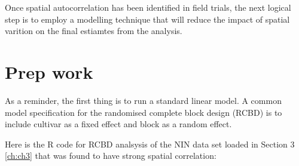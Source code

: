 \documentclass[]{book}
\newenvironment{Shaded}{\begin{snugshade}}{\end{snugshade}}
\newcommand{\DataTypeTok}[1]{\textcolor[rgb]{0.13,0.29,0.53}{#1}}
\newcommand{\ErrorTok}[1]{\textcolor[rgb]{0.64,0.00,0.00}{\textbf{#1}}}
\newcommand{\FloatTok}[1]{\textcolor[rgb]{0.00,0.00,0.81}{#1}}
\newcommand{\KeywordTok}[1]{\textcolor[rgb]{0.13,0.29,0.53}{\textbf{#1}}}
\newcommand{\NormalTok}[1]{#1}
\newcommand{\OperatorTok}[1]{\textcolor[rgb]{0.81,0.36,0.00}{\textbf{#1}}}
\newcommand{\OtherTok}[1]{\textcolor[rgb]{0.56,0.35,0.01}{#1}}
\newcommand{\StringTok}[1]{\textcolor[rgb]{0.31,0.60,0.02}{#1}}
\begin{document}
\begin{Shaded}
\end{Shaded}

Once spatial autocorrelation has been identified in field trials, the next logical step is to employ a modelling technique that will reduce the impact of spatial varition on the final estiamtes from the analysis.

\hypertarget{prep-work}{%
\section{Prep work}\label{prep-work}}

As a reminder, the first thing is to run a standard linear model. A common model specification for the randomised complete block design (RCBD) is to include cultivar as a fixed effect and block as a random effect.

Here is the R code for RCBD analsysis of the NIN data set loaded in Section 3 \ref{ch:ch3} that was found to have strong spatial correlation:
\end{document}
